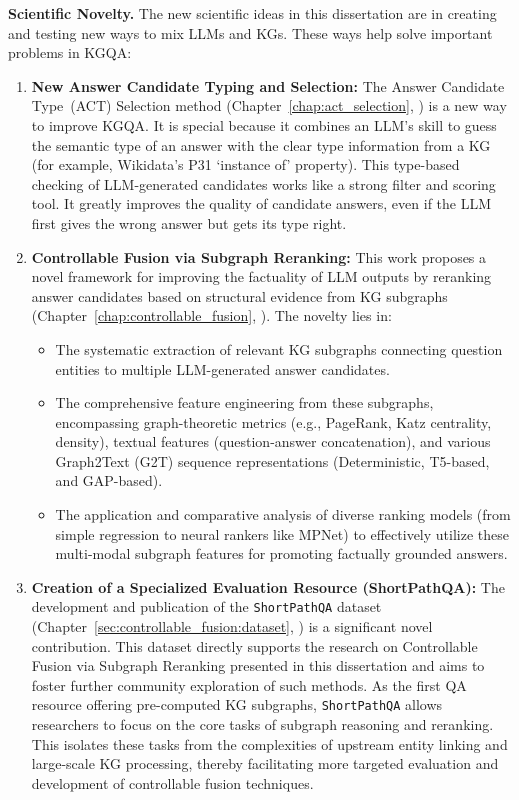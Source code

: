 \textbf{Scientific Novelty.}
The new scientific ideas in this dissertation are in creating and testing new ways to mix LLMs and KGs. These ways help solve important problems in KGQA:
\begin{enumerate}
    \item \textbf{New Answer Candidate Typing and Selection:} The Answer Candidate Type~(ACT) Selection method (Chapter~\ref{chap:act_selection}, \cite{DBLP:journals/corr/abs-2310-07008}) is a new way to improve KGQA. It is special because it combines an LLM's skill to guess the semantic type of an answer with the clear type information from a KG (for example, Wikidata's P31 `instance of' property). This type-based checking of LLM-generated candidates works like a strong filter and scoring tool. It greatly improves the quality of candidate answers, even if the LLM first gives the wrong answer but gets its type right.
    \item \textbf{Controllable Fusion via Subgraph Reranking:} This work proposes a novel framework for improving the factuality of LLM outputs by reranking answer candidates based on structural evidence from KG subgraphs (Chapter~\ref{chap:controllable_fusion}, \cite{DBLP:journals/corr/abs-2310-02166}). The novelty lies in:
    \begin{itemize}
        \item The systematic extraction of relevant KG subgraphs connecting question entities to multiple LLM-generated answer candidates.
        \item The comprehensive feature engineering from these subgraphs, encompassing graph-theoretic metrics (e.g., PageRank, Katz centrality, density), textual features (question-answer concatenation), and various Graph2Text (G2T) sequence representations (Deterministic, T5-based, and GAP-based).
        \item The application and comparative analysis of diverse ranking models (from simple regression to neural rankers like MPNet) to effectively utilize these multi-modal subgraph features for promoting factually grounded answers.
    \end{itemize}
    \item \textbf{Creation of a Specialized Evaluation Resource (ShortPathQA):} The development and publication of the \texttt{ShortPathQA} dataset (Chapter~\ref{sec:controllable_fusion:dataset}, \cite{DBLP:conf/nldb/SalnikovSPQA25}) is a significant novel contribution. This dataset directly supports the research on Controllable Fusion via Subgraph Reranking presented in this dissertation and aims to foster further community exploration of such methods. As the first QA resource offering pre-computed KG subgraphs, \texttt{ShortPathQA} allows researchers to focus on the core tasks of subgraph reasoning and reranking. This isolates these tasks from the complexities of upstream entity linking and large-scale KG processing, thereby facilitating more targeted evaluation and development of controllable fusion techniques.
\end{enumerate}

